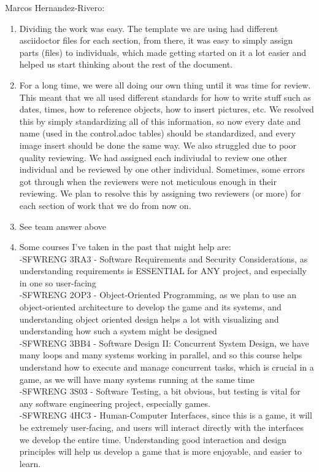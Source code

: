 \documentclass{article}
\begin{document}
Marcos Hernandez-Rivero:
\begin{enumerate}
\item Dividing the work was easy. The template we are using had different asciidoctor files for each section, from there, it was easy to simply assign parts (files) to individuals, which made getting started on it a lot easier and helped us start thinking about the rest of the document.
\item For a long time, we were all doing our own thing until it was time for review. This meant that we all used different standards for how to write stuff such as dates, times, how to reference objects, how to insert pictures, etc. We resolved this by simply standardizing all of this information, so now every date and name (used in the control.adoc tables) should be standardized, and every image insert should be done the same way. We also struggled due to poor quality reviewing. We had assigned each indiviudal to review one other individual and be reviewed by one other individual. Sometimes, some errors got through when the reviewers were not meticulous enough in their reviewing. We plan to resolve this by assigning two reviewers (or more) for each section of work that we do from now on.
\item See team answer above
\item Some courses I've taken in the past that might help are:\\
-SFWRENG 3RA3 - Software Requirements and Security Considerations, as understanding requirements is ESSENTIAL for ANY project, and especially in one so user-facing\\
-SFWRENG 2OP3 - Object-Oriented Programming, as we plan to use an object-oriented architecture to develop the game and its systems, and understanding object oriented design helps a lot with visualizing and understanding how such a system might be designed\\
-SFWRENG 3BB4 - Software Design II: Concurrent System Design, we have many loops and many systems working in parallel, and so this course helps understand how to execute and manage concurrent tasks, which is crucial in a game, as we will have many systems running at the same time\\
-SFWRENG 3S03 - Software Testing, a bit obvious, but testing is vital for any software engineering project, especially games.\\
-SFWRENG 4HC3 - Human-Computer Interfaces, since this is a game, it will be extremely user-facing, and users will interact directly with the interfaces we develop the entire time. Understanding good interaction and design principles will help us develop a game that is more enjoyable, and easier to learn.\\

\end{enumerate}
\end{document}
